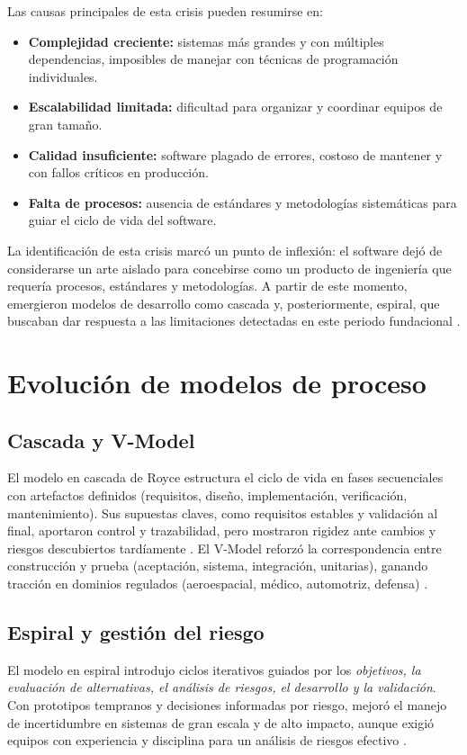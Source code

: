 \documentclass[conference]{IEEEtran}
\begin{document}
Las causas principales de esta crisis pueden resumirse en:
\begin{itemize}
    \item \textbf{Complejidad creciente:} sistemas más grandes y con múltiples dependencias, imposibles de manejar con técnicas de programación individuales.
    \item \textbf{Escalabilidad limitada:} dificultad para organizar y coordinar equipos de gran tamaño.
    \item \textbf{Calidad insuficiente:} software plagado de errores, costoso de mantener y con fallos críticos en producción.
    \item \textbf{Falta de procesos:} ausencia de estándares y metodologías sistemáticas para guiar el ciclo de vida del software.
\end{itemize}

La identificación de esta crisis marcó un punto de inflexión: el software dejó de considerarse un arte aislado para concebirse como un producto de ingeniería que requería procesos, estándares y metodologías. A partir de este momento, emergieron modelos de desarrollo como cascada y, posteriormente, espiral, que buscaban dar respuesta a las limitaciones detectadas en este periodo fundacional \cite{royce1970,boehm1988}.

\section{Evolución de modelos de proceso}

\subsection{Cascada y V-Model}
El modelo en cascada de Royce estructura el ciclo de vida en fases secuenciales con artefactos definidos (requisitos, diseño, implementación, verificación, mantenimiento). Sus supuestas claves, como requisitos estables y validación al final, aportaron control y trazabilidad, pero mostraron rigidez ante cambios y riesgos descubiertos tardíamente \cite{royce1970}. El V-Model reforzó la correspondencia entre construcción y prueba (aceptación, sistema, integración, unitarias), ganando tracción en dominios regulados (aeroespacial, médico, automotriz, defensa) \cite{sommerville10e}.

\subsection{Espiral y gestión del riesgo}
El modelo en espiral introdujo ciclos iterativos guiados por los \emph{objetivos, la evaluación de alternativas, el análisis de riesgos, el desarrollo y la validación}. Con prototipos tempranos y decisiones informadas por riesgo, mejoró el manejo de incertidumbre en sistemas de gran escala y de alto impacto, aunque exigió equipos con experiencia y disciplina para un análisis de riesgos efectivo \cite{boehm1988,pressman2019}.
\end{document}
